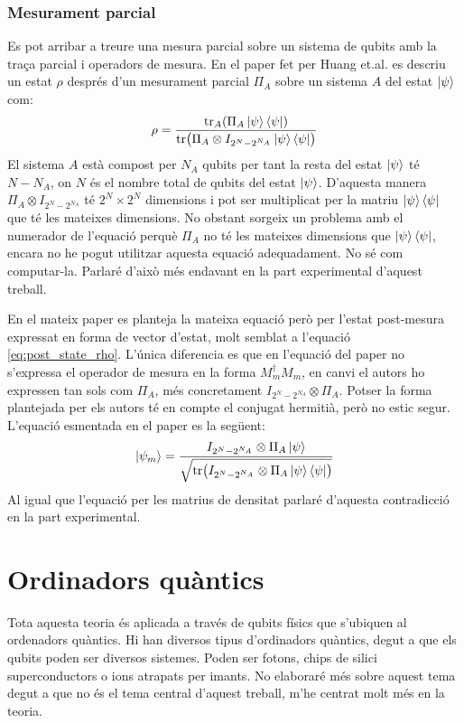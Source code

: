 \subsubsection{Mesurament parcial}
Es pot arribar a treure una mesura parcial sobre un sistema de qubits amb la traça parcial i operadors de mesura. En el paper fet per Huang et.al. \cite{QGAN_exp} es descriu un estat $\rho$ després d'un mesurament parcial $\Pi_A$ sobre un sistema $A$ del estat $\ket{\psi}$ com:
$$
\rho = \frac{\tr_A(\Pi_A \ket{\psi}\bra{\psi})}{\tr(\Pi_A\otimes I_{2^N-2^{N_A}}\ket{\psi}\bra{\psi})}
$$
El sistema $A$ està compost per $N_A$ qubits per tant la resta del estat $\ket{\psi}$ té $N-N_A$, on $N$ és el nombre total de qubits del estat $\ket{\psi}$. D'aquesta manera $\Pi_A\otimes I_{2^N-2^{N_A}}$ té $2^N\times 2^N$ dimensions i pot ser multiplicat per la matriu $\ket{\psi}\bra{\psi}$ que té les mateixes dimensions. No obstant sorgeix un problema amb el numerador de l'equació perquè $\Pi_A$ no té les mateixes dimensions que $\ket{\psi}\bra{\psi}$, encara no he pogut utilitzar aquesta equació adequadament. No sé com computar-la. Parlaré d'això més endavant en la part experimental d'aquest treball.

En el mateix paper es planteja la mateixa equació però per l'estat post-mesura expressat en forma de vector d'estat, molt semblat a l'equació \ref{eq:post_state_rho}. L'única diferencia es que en l'equació del paper no s'expressa el operador de mesura en la forma $M_m^\dagger M_m$, en canvi el autors ho expressen tan sols com $\Pi_A$, més concretament  $I_{2^N-2^{N_A}}\otimes \Pi_A$. Potser la forma plantejada per els autors té en compte el conjugat hermitià, però no estic segur.
L'equació esmentada en el paper es la següent:
$$
\ket{\psi_m} = \frac{I_{2^N-2^{N_A}}\otimes\Pi_A\ket{\psi}}{\sqrt{\tr(I_{2^N-2^{N_A}}\otimes\Pi_A\ket{\psi}\bra{\psi})}}
$$
Al igual que l'equació per les matrius de densitat parlaré d'aquesta contradicció en la part experimental.

\section{Ordinadors quàntics}
Tota aquesta teoria és aplicada a través de qubits físics que s'ubiquen al ordenadors quàntics. Hi han diversos tipus d'ordinadors quàntics, degut a que els qubits poden ser diversos sistemes. Poden ser fotons, chips de silici superconductors o ions atrapats per imants. No elaboraré més sobre aquest tema degut a que no és el tema central d'aquest treball, m'he centrat molt més en la teoria. 

